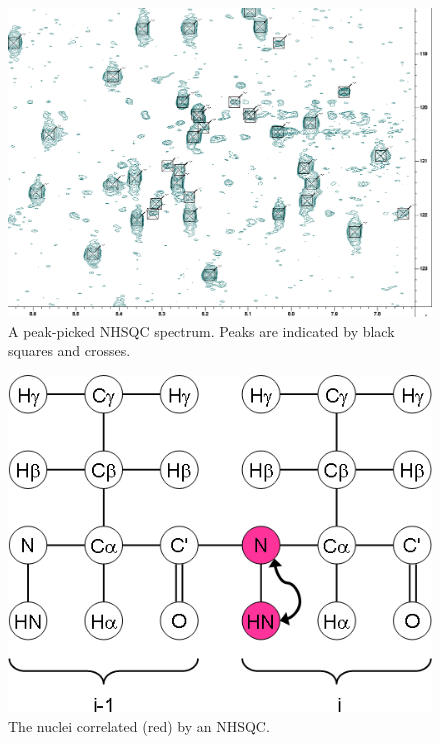 \begin{figure}
  \includegraphics[scale=0.35]{figures/nhsqc_peaks}
  \caption[A peak-picked NHSQC spectrum]
          {A peak-picked NHSQC spectrum. 
           Peaks are indicated by black squares and crosses.}
  \label{nhsqc_peaks}
\end{figure}

\begin{figure}
  \includegraphics[scale=0.75]{figures/ccpn_nhsqc}
  \caption[The nuclei correlated by an NHSQC.]
          {The nuclei correlated (red) by an NHSQC.}
  \label{ccpn_nhsqc}
\end{figure}

